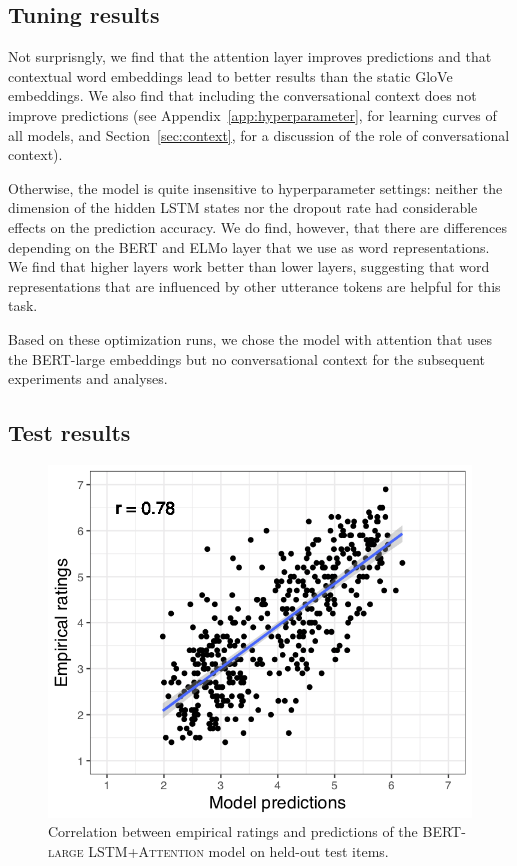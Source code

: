 \documentclass[11pt,a4paper]{article}
\begin{document}
\subsection{Tuning results}

Not surprisngly, we find that the attention layer improves predictions and that contextual word embeddings lead to better results than the static GloVe
embeddings. We also find that including the conversational context does not improve predictions (see Appendix~\ref{app:hyperparameter}, for learning curves of all models, and Section~\ref{sec:context}, for a discussion of the role of conversational context).

Otherwise, the model is quite insensitive to hyperparameter settings: neither the dimension of the hidden LSTM states nor the dropout rate had considerable effects
on the prediction accuracy. We do find, however, that there are differences depending on the BERT and ELMo layer that we use as word representations.
We find that higher layers work better than lower layers, suggesting that word representations that are influenced by other utterance tokens are helpful for this 
task.

Based on these optimization runs, we chose the model with attention that uses the BERT-large embeddings but no conversational context for the subsequent experiments and analyses.

\subsection{Test results}
\begin{figure}[t]
\center
\includegraphics[width=0.75\columnwidth]{./images/model-fit-eval.png}
\caption{Correlation between empirical ratings and predictions of the \textsc{BERT-large LSTM+Attention} model on held-out test items.}
	\label{fig:eval-correlations}
\end{figure}
\end{document}

